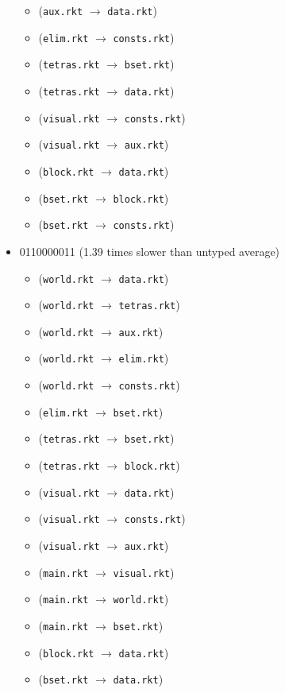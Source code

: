 \documentclass{article}
\newcommand{\mono}[1]{\texttt{#1}}
\begin{document}
\begin{itemize}
\begin{itemize}
  \item (\mono{aux.rkt} $\rightarrow$ \mono{data.rkt})
  \item (\mono{elim.rkt} $\rightarrow$ \mono{consts.rkt})
  \item (\mono{tetras.rkt} $\rightarrow$ \mono{bset.rkt})
  \item (\mono{tetras.rkt} $\rightarrow$ \mono{data.rkt})
  \item (\mono{visual.rkt} $\rightarrow$ \mono{consts.rkt})
  \item (\mono{visual.rkt} $\rightarrow$ \mono{aux.rkt})
  \item (\mono{block.rkt} $\rightarrow$ \mono{data.rkt})
  \item (\mono{bset.rkt} $\rightarrow$ \mono{block.rkt})
  \item (\mono{bset.rkt} $\rightarrow$ \mono{consts.rkt})
  \end{itemize}
\item 0110000011 (1.39 times slower than untyped average)
  \begin{itemize}
  \item (\mono{world.rkt} $\rightarrow$ \mono{data.rkt})
  \item (\mono{world.rkt} $\rightarrow$ \mono{tetras.rkt})
  \item (\mono{world.rkt} $\rightarrow$ \mono{aux.rkt})
  \item (\mono{world.rkt} $\rightarrow$ \mono{elim.rkt})
  \item (\mono{world.rkt} $\rightarrow$ \mono{consts.rkt})
  \item (\mono{elim.rkt} $\rightarrow$ \mono{bset.rkt})
  \item (\mono{tetras.rkt} $\rightarrow$ \mono{bset.rkt})
  \item (\mono{tetras.rkt} $\rightarrow$ \mono{block.rkt})
  \item (\mono{visual.rkt} $\rightarrow$ \mono{data.rkt})
  \item (\mono{visual.rkt} $\rightarrow$ \mono{consts.rkt})
  \item (\mono{visual.rkt} $\rightarrow$ \mono{aux.rkt})
  \item (\mono{main.rkt} $\rightarrow$ \mono{visual.rkt})
  \item (\mono{main.rkt} $\rightarrow$ \mono{world.rkt})
  \item (\mono{main.rkt} $\rightarrow$ \mono{bset.rkt})
  \item (\mono{block.rkt} $\rightarrow$ \mono{data.rkt})
  \item (\mono{bset.rkt} $\rightarrow$ \mono{data.rkt})

\end{itemize}
\end{itemize}
\end{document}
